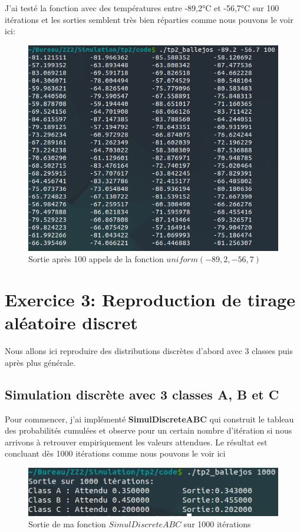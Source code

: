 \documentclass[12pt,french]{article} %
\begin{document}
J'ai testé la fonction avec des températures entre -89,2°C et -56,7°C sur 100 itérations et les sorties semblent très bien réparties comme nous pouvons le voir ici:

\begin{figure}[H]
	\centering
	\includegraphics[scale=0.5]{exo2-1.png}
	\caption{Sortie après 100 appels de la fonction $uniform(-89,2,-56,7)$ }    
\end{figure}

\newpage

\section{Exercice 3: Reproduction de tirage aléatoire discret}

Nous allons ici reproduire des distributions discrètes d'abord avec 3 classes puis après plus générale.

\subsection{Simulation discrète avec 3 classes A, B et C}


Pour commencer, j'ai implémenté \textbf{SimulDiscreteABC} qui construit le tableau des probabilités cumulées et observe pour un certain nombre d'itération si nous arrivons à retrouver empiriquement les valeurs attendues.
Le résultat est concluant dès 1000 itérations comme nous pouvons le voir ici

\begin{figure}[H]
\centering
\includegraphics[scale=0.8]{exo3-1.png}
\caption{Sortie de ma fonction $SimulDiscreteABC$ sur 1000 itérations}    
\end{figure}
\end{document}
